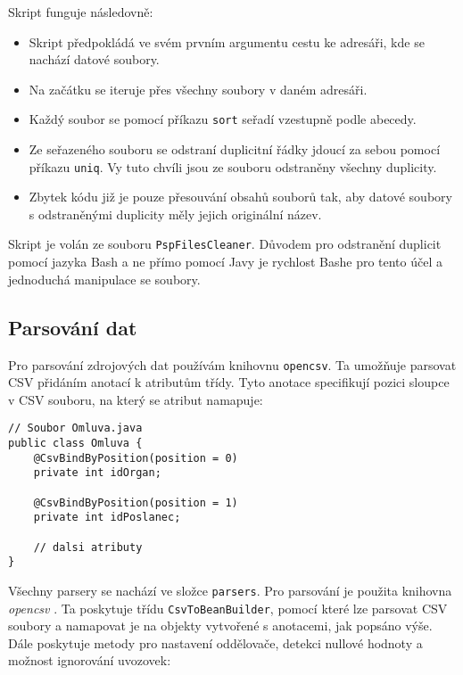 \noindent Skript funguje následovně:

\begin{itemize}
	\item Skript předpokládá ve svém prvním argumentu cestu ke adresáři, kde se nachází datové soubory.
	
	\item Na začátku se iteruje přes všechny soubory v daném adresáři.
	
	\item Každý soubor se pomocí příkazu \lstinline|sort| seřadí vzestupně podle abecedy.
	
	\item Ze seřazeného souboru se odstraní duplicitní řádky jdoucí za sebou pomocí příkazu \lstinline|uniq|. Vy tuto chvíli jsou ze souboru odstraněny všechny duplicity.
	
	\item Zbytek kódu již je pouze přesouvání obsahů souborů tak, aby datové soubory s odstraněnými duplicity měly jejich originální název.
\end{itemize}

\noindent Skript je volán ze souboru \lstinline|PspFilesCleaner|. Důvodem pro odstranění duplicit pomocí jazyka Bash a ne přímo pomocí Javy je rychlost Bashe pro tento účel a jednoduchá manipulace se soubory.

\subsection*{Parsování dat}
Pro parsování zdrojových dat používám knihovnu \lstinline|opencsv|. Ta umožňuje parsovat CSV přidáním anotací k atributům třídy. Tyto anotace specifikují pozici sloupce v CSV souboru, na který se atribut namapuje:

\begin{lstlisting}[caption={Parsování datového souboru omluvy.unl}, tabsize=2]
// Soubor Omluva.java
public class Omluva {
	@CsvBindByPosition(position = 0)
	private int idOrgan;
	
	@CsvBindByPosition(position = 1)
	private int idPoslanec;

	// dalsi atributy	
}
\end{lstlisting}

\noindent Všechny parsery se nachází ve složce \lstinline|parsers|. Pro parsování je použita knihovna \textit{opencsv} \cite{opencsv}. Ta poskytuje třídu \lstinline|CsvToBeanBuilder|, pomocí které lze parsovat CSV soubory a namapovat je na objekty vytvořené s anotacemi, jak popsáno výše. Dále poskytuje metody pro nastavení oddělovače, detekci nullové hodnoty a možnost ignorování uvozovek:


